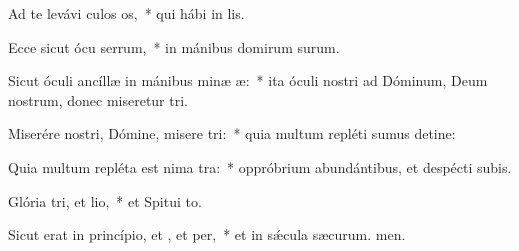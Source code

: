 \item Ad te levávi culos os,~* qui hábi in lis.
\item Ecce sicut ócu serrum,~* in mánibus domirum surum.
\item Sicut óculi ancíllæ in mánibus minæ æ:~* ita óculi nostri ad Dóminum, Deum nostrum, donec miseretur tri.
\item Miserére nostri, Dómine, misere tri:~* quia multum repléti sumus detine:
\item Quia multum repléta est nima tra:~* oppróbrium abundántibus, et despécti subis.
\item Glória tri, et lio,~* et Spitui to.
\item Sicut erat in princípio, et , et per,~* et in sǽcula sæcurum. men.
